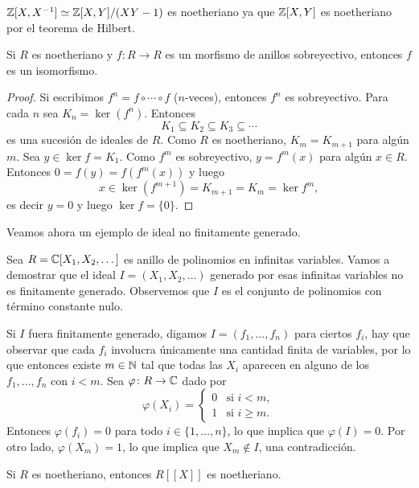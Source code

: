 \begin{example}
$\mathbb{Z}[X,X^{-1}]\simeq\mathbb{Z}[X,Y]/(XY-1)$ es noetheriano ya que $\mathbb{Z}[X,Y]$ es noetheriano por el teorema de Hilbert. 	
\end{example}

\begin{proposition}
Si $R$ es noetheriano y $f\colon R\to R$ es un morfismo de anillos sobreyectivo, entonces $f$ es un isomorfismo.	
\end{proposition}

\begin{proof}
	Si escribimos $f^n=f\circ\cdots\circ f$ ($n$-veces), entonces $f^n$ es sobreyectivo. Para cada $n$ sea $K_n=\ker(f^n)$. Entonces 
	\[
	K_1\subseteq K_2\subseteq K_3\subseteq\cdots
	\] 
	es una sucesión de ideales de $R$. Como $R$ es noetheriano, $K_m=K_{m+1}$ para algún $m$. Sea $y\in\ker f=K_1$. Como $f^m$ es
	sobreyectivo, $y=f^m(x)$ para algún $x\in R$. Entonces
	$0=f(y)=f(f^m(x))$ 
	y luego 
	\[
	x\in \ker(f^{m+1})=K_{m+1}=K_m=\ker f^m,
	\]
	es decir $y=0$ y luego $\ker f=\{0\}$. 
\end{proof}

Veamos ahora un ejemplo de ideal no finitamente generado.

\begin{example}
	Sea $R=\mathbb{C}[X_1,X_2,\dots]$ es anillo de polinomios en infinitas variables. Vamos a demostrar que el ideal 
	$I=(X_1,X_2,\dots)$ generado por esas infinitas variables no es finitamente generado. Observemos que $I$ es el conjunto de polinomios con término constante nulo.  
	
	Si $I$ fuera finitamente generado, digamos 
	$I=(f_1,\dots,f_n)$ para ciertos $f_i$, hay que observar que cada $f_i$ involucra únicamente una cantidad finita de variables, por lo que entonces
	existe $m\in\mathbb{N}$ tal que todas las $X_i$ aparecen en alguno de los $f_1,\dots,f_n$ con $i<m$. Sea $\varphi\colon R\to\mathbb{C}$ 
	dado por
	\[
	\varphi(X_i)=
	\begin{cases}
		0 & \text{si $i<m$},\\
		1 & \text{si $i\geq m$}.
	\end{cases}
	\]
	Entonces $\varphi(f_i)=0$ para todo $i\in\{1,\dots,n\}$, lo que implica que $\varphi(I)=0$. Por otro lado, $\varphi(X_m)=1$, lo que implica que $X_m\not\in I$, una contradicción. 		
\end{example}

\begin{exercise}
Si $R$ es noetheriano, entonces $R[[X]]$ es noetheriano.
\end{exercise}


